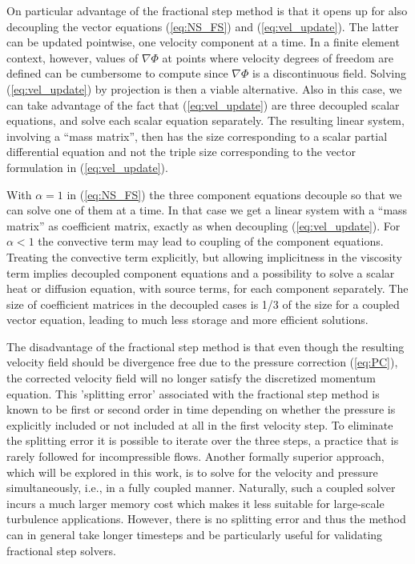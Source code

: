 On particular advantage of the fractional step method is that it opens
up for also decoupling the vector equations (\ref{eq:NS_FS})
and (\ref{eq:vel_update}). The latter can be updated pointwise,
one velocity component at a time. In a finite element context, however,
values of $\nabla\Phi$ at points where velocity degrees of freedom
are defined can be cumbersome to compute since $\nabla\Phi$ is
a discontinuous field. Solving (\ref{eq:vel_update}) by projection
is then a viable alternative. Also in this case, we can take advantage
of the fact that (\ref{eq:vel_update}) are three decoupled
scalar equations, and solve each scalar equation separately.
The resulting linear system, involving a ``mass matrix'', then has the size 
corresponding to a scalar partial differential equation and not the
triple size corresponding to the vector formulation in (\ref{eq:vel_update}).

With $\alpha =1$ in (\ref{eq:NS_FS}) the three component equations
decouple so that we can solve one of them at a time. In that case
we get a linear system with a ``mass matrix'' as coefficient matrix,
exactly as when decoupling (\ref{eq:vel_update}).
For $\alpha <1$ the convective term may lead to coupling of the
component equations. Treating the convective term explicitly, but
allowing implicitness in the viscosity term implies decoupled
component equations and a possibility to solve a scalar heat or 
diffusion equation, with source terms, for each component separately.
The size of coefficient matrices in the decoupled cases is 1/3
of the size for a coupled vector equation, leading to much less
storage and more efficient solutions.


The disadvantage of the fractional step method is
that even though the resulting velocity field should be divergence
free due to the pressure correction (\ref{eq:PC}), 
the corrected velocity field will
no longer satisfy the discretized momentum equation. This 'splitting
error' associated with the fractional step method is known to be first
or second order in time depending on whether the pressure is
explicitly included or not included at all in the first velocity
step. To eliminate the splitting error it is possible to iterate over
the three steps, a practice that is rarely followed for incompressible
flows. Another formally superior approach, which will be explored in
this work, is to solve for the velocity and pressure
simultaneously, i.e., in a fully coupled manner. 
Naturally, such a coupled solver incurs a much larger
memory cost which makes it  less suitable for large-scale turbulence
applications. However, there is no splitting error and thus the method
can in general take longer timesteps and be particularly useful for
validating fractional step solvers.

